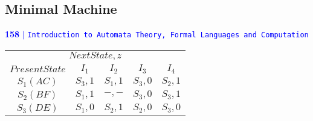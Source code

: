 \documentclass[9pt]{beamer}
\begin{document}
\begin{frame}
\section*{Minimal Machine}
  \begin{flushleft}
 \textcolor{blue}{\textbf{158}\hspace*{0.1cm} \textbf{$|$} \hspace*{0.1cm} \texttt{Introduction to Automata Theory, Formal Languages and Computation}}
  \end{flushleft}

\vspace*{2cm}

\begin{center}
\begin{tabular}{ccccc}
 \hline

 \hline

 \hline

 \hline

\multicolumn{5}{c}{$Next State, z$}\\
 \cline{2-5}
       $Present State$   &    $I_1$      &    $I_2$        &        $I_3$   &     $I_4$      \\
 \hline
       $S_1(AC)$         &    $S_3, 1$   &     $S_1, 1$    &     $S_3, 0$   &   $S_2, 1$     \\
       $S_2(BF)$         &    $S_1, 1$   &     $-, -$      &     $S_3, 0$   &   $S_3, 1$      \\
       $S_3(DE)$         &    $S_1, 0$   &     $S_2, 1$    &     $S_2, 0$   &   $S_3, 0$     \\
 \hline

 \hline

 \hline

 \hline
\end{tabular}
\end{center}
\end{frame}
\end{document}
